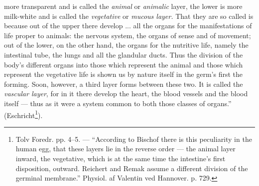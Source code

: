 \documentclass[12pt,a4paper]{book}
\begin{document}
\setcounter{footnote}{0}
more transparent and is called the \emph{animal} or \emph{animalic} layer, the
lower is more milk-white and is called the \emph{vegetative} or \emph{mucous
layer.} That they are so called is because out of the upper there develop ... all
the organs for the manifestations of life proper to animals: the nervous system,
the organs of sense and of movement; out of the lower, on the other hand, the
organs for the nutritive life, namely the intestinal tube, the lungs and all the
glandular ducts. Thus the division of the body's different organs into those which
represent the animal and those which represent the vegetative life is shown us by
nature itself in the germ's first the forming. Soon, however, a third layer forms
between these two. It is called the \emph{vascular layer}, for in it there develop
the heart, the blood vessels and the blood itself --- thus as it were a system
common to both those classes of organs.'' (Eschricht\footnote{Tolv Foredr.
pp. 4--5. --- ``According to Bischof there is this peculiarity in the human egg,
that these layers lie in the reverse order --- the animal layer inward, the
vegetative, which is at the same time the intestine's first disposition, outward.
Reichert and Remak assume a different division of the germinal membrane.''
Physiol. af Valentin ved Hannover. p. 729.}).
\end{document}
